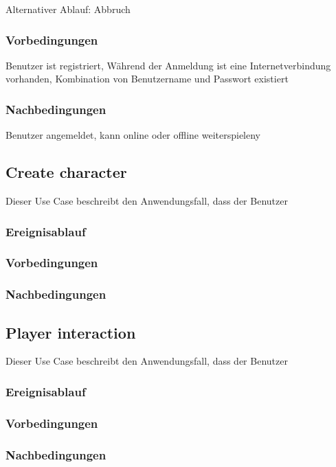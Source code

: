 			Alternativer Ablauf: Abbruch
			
		\subsubsection{Vorbedingungen}
			Benutzer ist registriert, Während der Anmeldung ist eine Internetverbindung vorhanden, Kombination von Benutzername und Passwort existiert
			
		\subsubsection{Nachbedingungen}
			Benutzer angemeldet, kann online oder offline weiterspieleny
	
	\subsection{Create character}
		Dieser Use Case beschreibt den Anwendungsfall, dass der Benutzer 
			
		\subsubsection{Ereignisablauf}
	
		\subsubsection{Vorbedingungen}
			
		\subsubsection{Nachbedingungen}
	
	\subsection{Player interaction}
		Dieser Use Case beschreibt den Anwendungsfall, dass der Benutzer 
			
		\subsubsection{Ereignisablauf}
			
		\subsubsection{Vorbedingungen}
			
		\subsubsection{Nachbedingungen}
	
